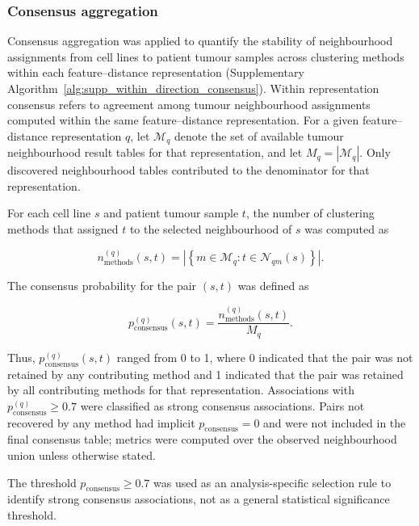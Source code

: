 \subsubsection{Consensus aggregation}

Consensus aggregation was applied to quantify the stability of neighbourhood
assignments from cell lines to patient tumour samples across clustering
methods within each feature--distance representation (Supplementary
Algorithm~\ref{alg:supp_within_direction_consensus}). Within
representation consensus refers to agreement among tumour neighbourhood
assignments computed within the same feature--distance representation. For a
given feature--distance representation \(q\), let \(\mathcal{M}_q\) denote
the set of available tumour neighbourhood result tables for that
representation, and let \(M_q = |\mathcal{M}_q|\). Only discovered
neighbourhood tables contributed to the denominator for that representation.

For each cell line \(s\) and patient tumour sample \(t\), the
number of clustering methods that assigned \(t\) to the selected
neighbourhood of \(s\) was computed as

\begin{equation}
n_{\mathrm{methods}}^{(q)}(s,t) =
\left|
\left\{
m \in \mathcal{M}_q :
t \in \mathcal{N}_{qm}(s)
\right\}
\right|.
\end{equation}

The consensus probability for the pair \((s,t)\) was defined as

\begin{equation}
p_{\mathrm{consensus}}^{(q)}(s,t) =
\frac{
n_{\mathrm{methods}}^{(q)}(s,t)
}{
M_q
}.
\end{equation}

Thus, \(p_{\mathrm{consensus}}^{(q)}(s,t)\) ranged from 0 to 1, where
0 indicated that the pair was not retained by any contributing method
and 1 indicated that the pair was retained by all contributing methods
for that representation. Associations with
\(p_{\mathrm{consensus}}^{(q)} \geq 0.7\) were classified as strong
consensus associations.
Pairs not recovered by any method had implicit \(p_{\mathrm{consensus}}=0\) and were not included in the final consensus table; metrics were computed over the observed neighbourhood union unless otherwise stated.

The threshold \(p_{\mathrm{consensus}} \geq 0.7\) was used as an analysis-specific selection rule to identify strong consensus associations, not as a general statistical significance threshold.

